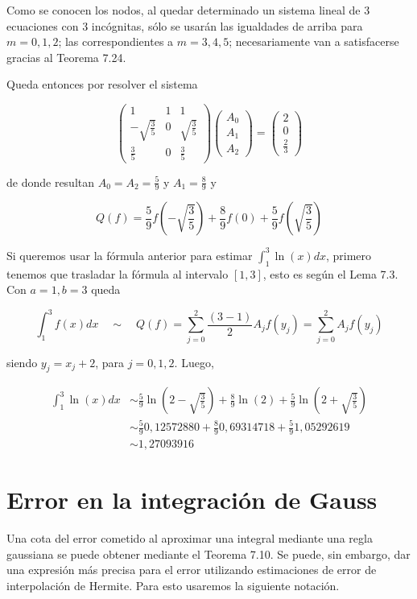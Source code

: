 \documentclass[10pt]{article}
\begin{document}
Como se conocen los nodos, al quedar determinado un sistema lineal de 3 ecuaciones con 3 incógnitas, sólo se usarán las igualdades de arriba para $m=0,1,2$; las correspondientes a $m=3,4,5$; necesariamente van a satisfacerse gracias al Teorema 7.24.

Queda entonces por resolver el sistema

$$
\left(\begin{array}{ccc}
1 & 1 & 1 \\
-\sqrt{\frac{3}{5}} & 0 & \sqrt{\frac{3}{5}} \\
\frac{3}{5} & 0 & \frac{3}{5}
\end{array}\right)\left(\begin{array}{c}
A_{0} \\
A_{1} \\
A_{2}
\end{array}\right)=\left(\begin{array}{c}
2 \\
0 \\
\frac{2}{3}
\end{array}\right)
$$

de donde resultan $A_{0}=A_{2}=\frac{5}{9}$ y $A_{1}=\frac{8}{9}$ y

$$
Q(f)=\frac{5}{9} f\left(-\sqrt{\frac{3}{5}}\right)+\frac{8}{9} f(0)+\frac{5}{9} f\left(\sqrt{\frac{3}{5}}\right)
$$

Si queremos usar la fórmula anterior para estimar $\int_{1}^{3} \ln (x) d x$, primero tenemos que trasladar la fórmula al intervalo $[1,3]$, esto es según el Lema 7.3. Con $a=1, b=3$ queda

$$
\int_{1}^{3} f(x) d x \quad \sim \quad Q(f)=\sum_{j=0}^{2} \frac{(3-1)}{2} A_{j} f\left(y_{j}\right)=\sum_{j=0}^{2} A_{j} f\left(y_{j}\right)
$$

siendo $y_{j}=x_{j}+2$, para $j=0,1,2$. Luego,

$$
\begin{aligned}
\int_{1}^{3} \ln (x) d x & \sim \frac{5}{9} \ln \left(2-\sqrt{\frac{3}{5}}\right)+\frac{8}{9} \ln (2)+\frac{5}{9} \ln \left(2+\sqrt{\frac{3}{5}}\right) \\
& \sim \frac{5}{9} 0,12572880+\frac{8}{9} 0,69314718+\frac{5}{9} 1,05292619 \\
& \sim 1,27093916
\end{aligned}
$$

\section*{Error en la integración de Gauss}
Una cota del error cometido al aproximar una integral mediante una regla gaussiana se puede obtener mediante el Teorema 7.10. Se puede, sin embargo, dar una expresión más precisa para el error utilizando estimaciones de error de interpolación de Hermite. Para esto usaremos la siguiente notación.
\end{document}
